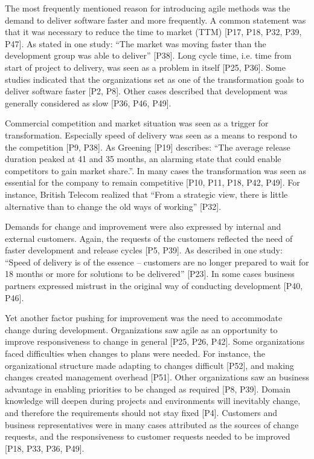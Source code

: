 \documentclass[preprint,authoryear,12pt]{elsarticle}
\begin{document}
The most frequently mentioned reason for introducing agile methods was the demand to
deliver software faster and more frequently. A common statement was that it was
necessary to reduce the time to market (TTM) [P17, P18, P32, P39, P47]. As
stated in one study: ``The market was moving faster than the development group
was able to deliver'' [P38]. Long cycle time, i.e. time from start of project to
delivery, was seen as a problem in itself [P25, P36]. Some studies indicated
that the organizations set as one of the transformation goals to deliver
software faster [P2, P8]. Other cases described that development was generally
considered as slow [P36, P46, P49].

Commercial competition and market situation was seen as a trigger for
transformation. Especially speed of delivery was seen as a means to respond to
the competition [P9, P38]. As Greening [P19] describes: ``The average release
duration peaked at 41 and 35 months, an alarming state that could enable
competitors to gain market share.''. In many cases the transformation was seen
as essential for the company to remain competitive [P10, P11, P18, P42, P49].
For instance, British Telecom realized that ``From a strategic view, there is
little alternative than to change the old ways of working'' [P32].

Demands for change and improvement were also expressed by internal and external
customers. Again, the requests of the customers reflected the need of faster
development and release cycles [P5, P39]. As described in one study: ``Speed of
delivery is of the essence -- customers are no longer prepared to wait for 18
months or more for solutions to be delivered'' [P23]. In some cases business
partners expressed mistrust in the original way of conducting development [P40,
P46].

Yet another factor pushing for improvement was the need to accommodate change
during development. Organizations saw agile as an opportunity to improve
responsiveness to change in general [P25, P26, P42].
Some organizations faced difficulties when changes to plans were needed. For
instance, the organizational structure made adapting to changes difficult [P52],
and making changes created management overhead [P51]. Other organizations saw an
business advantage in enabling priorities to be changed as required [P8, P39].
Domain knowledge will deepen during projects and environments will inevitably
change, and therefore the requirements should not stay fixed [P4].
Customers and business representatives were in many cases attributed as the
sources of change requests, and the responsiveness to customer requests needed
to be improved [P18, P33, P36, P49].
\end{document}
